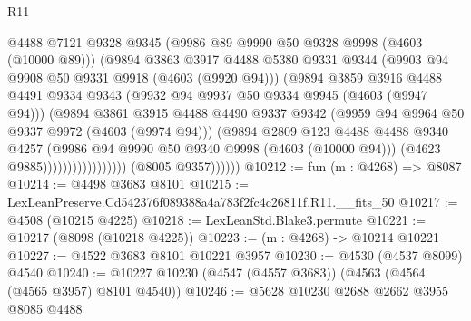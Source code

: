 \begin{lexlean}{R11}
\begin{coremodule}
                                      @4488
                                      @7121
                                      @9328
                                      @9345
                                      (@9986 @89 @9990 @50 @9328 @9998 (@4603 (@10000 @89)))
                                      (@9894
                                        @3863
                                        @3917
                                        @4488
                                        @5380
                                        @9331
                                        @9344
                                        (@9903 @94 @9908 @50 @9331 @9918 (@4603 (@9920 @94)))
                                        (@9894
                                          @3859
                                          @3916
                                          @4488
                                          @4491
                                          @9334
                                          @9343
                                          (@9932 @94 @9937 @50 @9334 @9945 (@4603 (@9947 @94)))
                                          (@9894
                                            @3861
                                            @3915
                                            @4488
                                            @4490
                                            @9337
                                            @9342
                                            (@9959 @94 @9964 @50 @9337 @9972 (@4603 (@9974 @94)))
                                            (@9894
                                              @2809
                                              @123
                                              @4488
                                              @4488
                                              @9340
                                              @4257
                                              (@9986 @94 @9990 @50 @9340 @9998 (@4603 (@10000 @94)))
                                              (@4623 @9885)))))))))))))))))
              (@8005 @9357))))))
@10212 := fun (m : @4268) => @8087
@10214 := @4498 @3683 @8101
@10215 := LexLeanPreserve.Cd542376f089388a4a783f2fc4c26811f.R11.__fits_50
@10217 := @4508 (@10215 @4225)
@10218 := LexLeanStd.Blake3.permute
@10221 := @10217 (@8098 (@10218 @4225))
@10223 := (m : @4268) -> @10214 @10221
@10227 := @4522 @3683 @8101 @10221 @3957
@10230 := @4530 (@4537 @8099) @4540
@10240 := @10227 @10230 (@4547 (@4557 @3683)) (@4563 (@4564 (@4565 @3957) @8101 @4540))
@10246 := @5628 @10230 @2688 @2662 @3955 @8085 @4488

\end{coremodule}
\end{lexlean}
